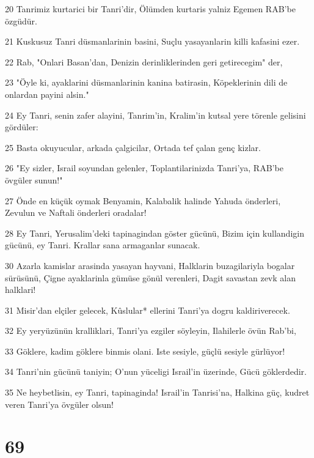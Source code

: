 \par 20 Tanrimiz kurtarici bir Tanri'dir, Ölümden kurtaris yalniz Egemen RAB'be özgüdür.
\par 21 Kuskusuz Tanri düsmanlarinin basini, Suçlu yasayanlarin killi kafasini ezer.
\par 22 Rab, "Onlari Basan'dan, Denizin derinliklerinden geri getirecegim" der,
\par 23 "Öyle ki, ayaklarini düsmanlarinin kanina batirasin, Köpeklerinin dili de onlardan payini alsin."
\par 24 Ey Tanri, senin zafer alayini, Tanrim'in, Kralim'in kutsal yere törenle gelisini gördüler:
\par 25 Basta okuyucular, arkada çalgicilar, Ortada tef çalan genç kizlar.
\par 26 "Ey sizler, Israil soyundan gelenler, Toplantilarinizda Tanri'ya, RAB'be övgüler sunun!"
\par 27 Önde en küçük oymak Benyamin, Kalabalik halinde Yahuda önderleri, Zevulun ve Naftali önderleri oradalar!
\par 28 Ey Tanri, Yerusalim'deki tapinagindan göster gücünü, Bizim için kullandigin gücünü, ey Tanri. Krallar sana armaganlar sunacak.
\par 30 Azarla kamislar arasinda yasayan hayvani, Halklarin buzagilariyla bogalar sürüsünü, Çigne ayaklarinla gümüse gönül verenleri, Dagit savastan zevk alan halklari!
\par 31 Misir'dan elçiler gelecek, Kûslular* ellerini Tanri'ya dogru kaldiriverecek.
\par 32 Ey yeryüzünün kralliklari, Tanri'ya ezgiler söyleyin, Ilahilerle övün Rab'bi,
\par 33 Göklere, kadim göklere binmis olani. Iste sesiyle, güçlü sesiyle gürlüyor!
\par 34 Tanri'nin gücünü taniyin; O'nun yüceligi Israil'in üzerinde, Gücü göklerdedir.
\par 35 Ne heybetlisin, ey Tanri, tapinaginda! Israil'in Tanrisi'na, Halkina güç, kudret veren Tanri'ya övgüler olsun!

\chapter{69}

